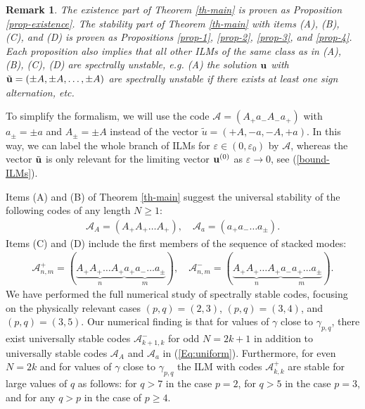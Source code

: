 \documentclass[12pt,reqno]{amsart}
\newtheorem{remark}{Remark}
\begin{document}
\begin{remark}
	The existence part of Theorem \ref{th-main} is proven as Proposition \ref{prop-existence}. The stability part of Theorem \ref{th-main} with items (A), (B), (C), and (D) is proven as Propositions \ref{prop-1}, \ref{prop-2}, \ref{prop-3}, and \ref{prop-4}. Each proposition also implies that all other ILMs of the same class as in (A), (B), (C), (D) are spectrally unstable, e.g. (A) the solution ${\bf u}$ with 
	$\tilde{\bf u} = (\pm A,\pm A,\dots, \pm A)$ are spectrally unstable if there exists at least one sign alternation, etc. 
\end{remark}

To simplify the formalism, we will use the code 
$\mathcal{A} = (A_+a_-A_-a_+)$ with $a_{\pm} = \pm a$ and $A_{\pm} = \pm A$ 
instead of the vector $\tilde{u} = (+A,-a,-A,+a)$. In this way, we can label 
the whole branch of ILMs for $\varepsilon \in (0,\varepsilon_0)$ by $\mathcal{A}$, whereas the 
vector $\tilde{\bf u}$ is only relevant for the limiting vector ${\bf u}^{(0)}$ as $\varepsilon \to 0$, see (\ref{bound-ILMs}).  

Items (A) and (B) of Theorem \ref{th-main} suggest the universal stability of the following codes of any length $N \geq 1$:
\begin{gather}
\mathcal{A}_A=(A_+A_+\ldots A_+),\quad \mathcal{A}_a=(a_+a_-\ldots a_\pm). \label{Eq:uniform}
\end{gather}
Items (C) and (D) include the first members of the sequence of stacked modes:
\begin{gather}
{\mathcal A}_{n,m}^+=(\underbrace{A_+A_+\ldots A_+}_{n} \underbrace{a_+a_-\ldots a_\pm}_{m}),\quad {\mathcal A}_{n,m}^-=(\underbrace{A_+A_+\ldots A_+}_{n} \underbrace{a_-a_+\ldots a_\pm}_{m}). \label{Eq:Stacked}
\end{gather}
We have performed the full numerical study of spectrally stable codes, focusing on the physically relevant cases $(p,q) = (2,3)$, $(p,q) = (3,4)$, and $(p,q) = (3,5)$. Our numerical finding is that for values of $\gamma$ close to $\gamma_{p,q}$, there exist universally stable codes $\mathcal{A}^-_{k+1,k}$ for odd $N = 2k + 1$ in addition to universally stable codes $\mathcal{A}_A$ and $\mathcal{A}_a$ in (\ref{Eq:uniform}). Furthermore, for even $N=2k$ and for values of $\gamma$ close to $\gamma_{p,q}$ the ILM with codes $\mathcal{A}^+_{k,k}$ are stable for large values of $q$ as follows: for $q > 7$ in the case $p=2$, 
for $q > 5$ in the case  $p=3$, and for any $q > p$ in the case of $p \geq 4$.
\end{document}
